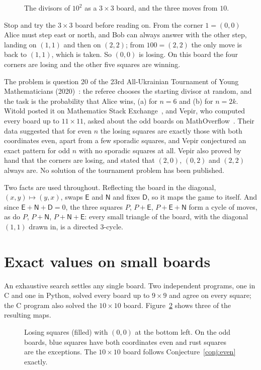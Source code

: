\documentclass[11pt]{article}
\theoremstyle{remark}
\newcommand{\E}{\mathsf{E}}
\newcommand{\N}{\mathsf{N}}
\newcommand{\D}{\mathsf{D}}
\begin{document}
\begin{figure}[ht]
\centering

\caption{The divisors of $10^2$ as a $3\times 3$ board, and the three moves from $10$.}
\label{fig:moves}
\end{figure}

Stop and try the $3\times3$ board before reading on. From the corner $1=(0,0)$ Alice must step
east or north, and Bob can always answer with the other step, landing on $(1,1)$ and then on
$(2,2)$; from $100=(2,2)$ the only move is back to $(1,1)$, which is taken. So $(0,0)$ is losing.
On this board the four corners are losing and the other five squares are winning.

The problem is question 20 of the 23rd All-Ukrainian Tournament of Young Mathematicians
(2020)~\cite{TYM}: the referee chooses the starting divisor at random, and the task is the
probability that Alice wins, (a) for $n=6$ and (b) for $n=2k$. Witold posted it on Mathematics
Stack Exchange~\cite{MSE}, and Vepir, who computed every board up to $11\times11$, asked about
the odd boards on MathOverflow~\cite{MO}. Their data suggested that for even $n$ the losing squares
are exactly those with both coordinates even, apart from a few sporadic squares, and Vepir
conjectured an exact pattern for odd $n$ with no sporadic squares at all. Vepir also proved by
hand that the corners are losing, and stated that $(2,0)$, $(0,2)$ and $(2,2)$ always are. No
solution of the tournament problem has been published.

Two facts are used throughout. Reflecting the board in the diagonal, $(x,y)\mapsto(y,x)$, swaps
$\E$ and $\N$ and fixes $\D$, so it maps the game to itself. And since $\E+\N+\D=0$, the three
squares $P$, $P+\E$, $P+\E+\N$ form a cycle of moves, as do $P$, $P+\N$, $P+\N+\E$: every
small triangle of the board, with the diagonal $(1,1)$ drawn in, is a directed $3$-cycle.

\section{Exact values on small boards}

An exhaustive search settles any single board. Two independent programs, one in C and one in
Python, solved every board up to $9\times 9$ and agree on every square; the C program also
solved the $10\times10$ board. Figure~\ref{fig:maps} shows three of the resulting maps.

\begin{figure}[ht]
\centering

\caption{Losing squares (filled) with $(0,0)$ at the bottom left. On the odd boards, blue squares
have both coordinates even and rust squares are the exceptions. The $10\times 10$ board follows
Conjecture~\ref{conj:even} exactly.}
\label{fig:maps}
\end{figure}
\end{document}
